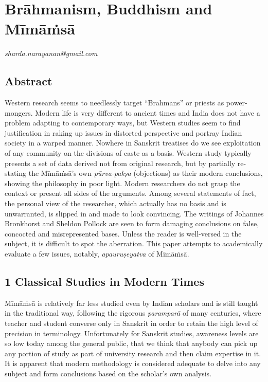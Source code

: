 
\chapter{Brāhmanism, Buddhism and Mīmāṁsā}\label{chapter6}


\begin{flushright}
\textit{sharda.narayanan@gmail.com}
\end{flushright}


\section*{Abstract}

Western research seems to needlessly target “Brahmans” or priests as power-mongers. Modern life is very different to ancient times and India does not have a problem adapting to contemporary ways, but Western studies seem to find justification in raking up issues in distorted perspective and portray Indian society in a warped manner. Nowhere in Sanskrit treatises do we see exploitation of any community on the divisions of caste as a basis. Western study typically presents a set of data derived not from original research, but by partially re-stating the Mīmāṁsā’s own \textit{pūrva-pakṣa} (objections) as their modern conclusions, showing the philosophy in poor light. Modern researchers do not grasp the context or present all sides of the arguments. Among several statements of fact, the personal view of the researcher, which actually has no basis and is unwarranted, is slipped in and made to look convincing. The writings of Johannes Bronkhorst and Sheldon Pollock are seen to form damaging conclusions on false, concocted and misrepresented bases. Unless the reader is well-versed in the subject, it is difficult to spot the aberration. This paper attempts to academically evaluate a few issues, notably, \textit{apauruṣeyatva} of Mīmāṁsā.


\section*{1 Classical Studies in Modern Times}

Mīmāṁsā is relatively far less studied even by Indian scholars and is still taught in the traditional way, following the rigorous \textit{paramparā} of many centuries, where teacher and student converse only in Sanskrit in order to retain the high level of precision in terminology. Unfortunately for Sanskrit studies, awareness levels are so low today among the general public, that we think that anybody can pick up any portion of study as part of university research and then claim expertise in it. It is apparent that modern methodology is considered adequate to delve into any subject and form conclusions based on the scholar’s own analysis.

